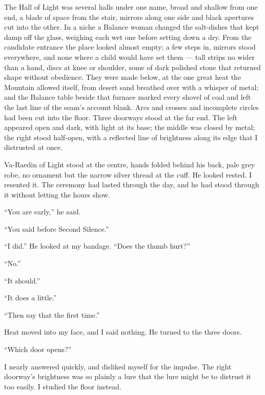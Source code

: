 The Hall of Light was several halls under one name, broad and shallow from one end, a blade of space from the stair, mirrors along one side and black apertures cut into the other. In a niche a Balance woman changed the salt-dishes that kept damp off the glass, weighing each wet one before setting down a dry. From the candidate entrance the place looked almost empty; a few steps in, mirrors stood everywhere, and none where a child would have set them --- tall strips no wider than a hand, discs at knee or shoulder, some of dark polished stone that returned shape without obedience. They were made below, at the one great heat the Mountain allowed itself, from desert sand breathed over with a whisper of metal; and the Balance table beside that furnace marked every shovel of coal and left the last line of the seam's account blank. Arcs and crosses and incomplete circles had been cut into the floor.
Three doorways stood at the far end. The left appeared open and dark, with light at its base; the middle was closed by metal; the right stood half-open, with a reflected line of brightness along its edge that I distrusted at once.\par

Va-Raedin of Light stood at the centre, hands folded behind his back, pale grey robe, no ornament but the narrow silver thread at the cuff. He looked rested. I resented it.
The ceremony had lasted through the day, and he had stood through it without letting the hours show.\par

``You are early,'' he said.\par
``You said before Second Silence.''\par
``I did.'' He looked at my bandage. ``Does the thumb hurt?''\par
``No.''\par
``It should.''\par
``It does a little.''\par
``Then say that the first time.''\par

Heat moved into my face, and I said nothing. He turned to the three doors. \par

``Which door opens?''\par

I nearly answered quickly, and disliked myself for the impulse. The right doorway's brightness was so plainly a lure that the lure might be to distrust it too easily.
I studied the floor instead.\par

